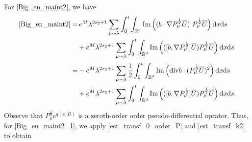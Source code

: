 \documentclass[10pt,twoside,a4paper]{article}
\numberwithin{equation}{section}\allowdisplaybreaks
\begin{document}
For \eqref{Big_en_maint2}, we have
\begin{align}
	\eqref{Big_en_maint2}	=& \, e^{M} \lambda^{2s_2+1} \sum_{\mu\sim \lambda} \int_0^t \int_{\mathbb{R}^d}  \mathrm{Im} \left( (b\cdot \nabla  P_\mu^{\frac 12}\overline{U} )~ P_\mu^{\frac 12}\overline{U}  \right)  \mathrm{d} x \mathrm{d} s\nonumber \\
	&+e^{M} \lambda^{2s_2+1} \sum_{\mu\sim \lambda} \int_0^t \int_{\mathbb{R}^d}  \mathrm{Im} \left(    ( [b , \nabla P_\mu^{\frac 12} ] \overline{U} )P_\mu^{\frac 12}\overline{U}  \right)  \mathrm{d} x \mathrm{d} s\nonumber\\
	=&- e^{M}\lambda^{2s_2+1}  \sum_{\mu\sim \lambda} \frac 12 \int_0^t \int_{\mathbb{R}^d}  \mathrm{Im} \left(    \mathrm{div}b \cdot (P_\mu^{\frac 12}\overline{U}) ^2  \right)  \mathrm{d} x \mathrm{d} s\label{Big_en_maint2_1}\\
	&+  e^{M} \lambda^{2s_2+1}\sum_{\mu\sim \lambda} \int_0^t \int_{\mathbb{R}^d}  \mathrm{Im} \left(    ( [b , \nabla P_\mu^{\frac 12} ] \overline{U} )P_\mu^{\frac 12}\overline{U}  \right)  \mathrm{d} x \mathrm{d} s. \label{Big_en_maint2_2}
\end{align}
Observe that $ P_\mu^{\frac 12}  e^{q (x,D)} $ is a zeroth-order order pseudo-differential oprator. Thus, for \eqref{Big_en_maint2_1}, we apply \eqref{est_transf_0_order_P} and \eqref{est_transf_k2} to obtain
\end{document}
